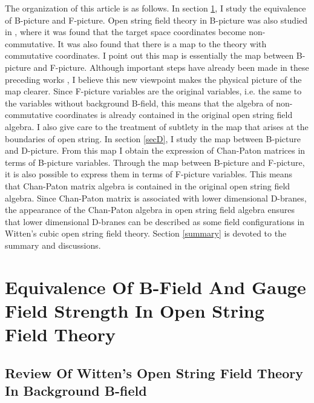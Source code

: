 \documentclass[a4paper,12pt]{article}
\begin{document}
The organization of this article is as follows.
In section \ref{secBF},
I study the equivalence of
B-picture and F-picture.
Open string field theory
in B-picture was also studied
in \cite{Sgi,KT1,KT2}, where
it was found that 
the target space coordinates
become non-commutative.
It was also found 
that there is a map 
to the theory with commutative coordinates.
I point out this map is essentially the map
between B-picture and F-picture.
Although important steps have already been made in
these preceding works \cite{Sgi,KT1,KT2}, I believe
this new viewpoint makes the physical picture
of the map clearer.
Since F-picture variables
are the original variables, i.e.
the same to the variables without background
B-field,
this means that
the algebra of non-commutative
coordinates
is already contained
in the original open string field algebra.
I also give care to the treatment of subtlety in
the map
that arises at the boundaries of open string.
In section \ref{secD},
I study the map between
B-picture and D-picture.
From this map I obtain
the expression of
Chan-Paton matrices 
in terms of B-picture variables.
Through the map between B-picture and F-picture,
it is also possible to express them
in terms of F-picture variables.
This means that
Chan-Paton matrix algebra
is contained in the original
open string field algebra.
Since Chan-Paton matrix
is associated with lower dimensional D-branes, 
the appearance of the Chan-Paton algebra
in open string field algebra ensures
that lower dimensional D-branes can be described as some
field configurations 
in Witten's cubic open string field theory.
Section \ref{summary} is devoted to the summary and discussions.

\section{Equivalence Of B-Field And
Gauge Field Strength
In Open String Field Theory}\label{secBF}

\subsection{Review Of Witten's Open String Field Theory
In Background B-field}
\end{document}
